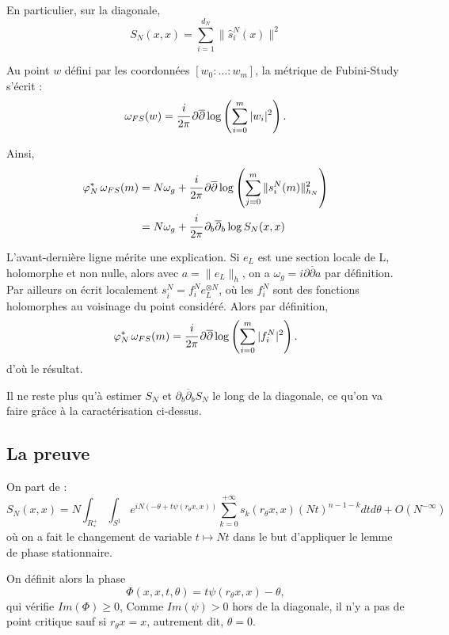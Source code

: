 En particulier, sur la diagonale,
\begin{equation*}
	S_N(x,x)=\sum_{i=1}^{d_N}\|\hat{s}^N_i(x)\|^2
\end{equation*}

Au point $w$ défini par les coordonnées $[w_0:\ldots:w_m]$, la métrique de Fubini-Study s'écrit :
\begin{equation*}
	\omega_{FS}(w) = \cfrac{i}{2\pi}\,\partial\overline{\partial} \log\left(\sum_{i=0}^m|w_i|^2\right).
\end{equation*}

Ainsi,
\begin{align*}
	\varphi_N^*\,\omega_{FS}(m) &= N \omega_g + \cfrac{i}{2\pi}\,\partial\overline{\partial} \log\left(\sum_{j=0}^m\|s^N_i(m)\|_{h_N}^2\right)\\
	&= N\omega_g + \cfrac{i}{2\pi}\,\partial_b\overline{\partial}_b \log S_N(x,x)
\end{align*}

L'avant-dernière ligne mérite une explication. Si $e_L$ est une section locale de L, holomorphe et non nulle, alors avec $a=\|e_L\|_h$, on a $\omega_g = i \partial \overline{\partial}a$ par définition. Par ailleurs on écrit localement $s^N_i=f_i^Ne_L^{\otimes N}$, où les $f^N_i$ sont des fonctions holomorphes au voisinage du point considéré. Alors par définition, 
\begin{equation*}
	\varphi_N^*\,\omega_{FS}(m) = \cfrac{i}{2\pi}\,\partial\overline{\partial} \log\left(\sum_{i=0}^m|f^N_i|^2\right).
\end{equation*}
d'où le résultat.

Il ne reste plus qu'à estimer $S_N$ et $\partial_b \overline{\partial}_bS_N$ le long de la diagonale, ce qu'on va faire grâce à la caractérisation ci-dessus.

\subsection{La preuve}
On part de :
\begin{equation*}
	S_N(x,x)=N\int_{R^+_*}\int_{S^1}e^{iN(-\theta + t\psi(r_{\theta}x,x))}\sum_{k=0}^{+\infty}s_k(r_{\theta}x,x)(Nt)^{n-1-k}dtd\theta + O(N^{-\infty})
\end{equation*}
où on a fait le changement de variable $t \mapsto Nt$ dans le but d'appliquer le lemme de phase stationnaire.

On définit alors la phase
\begin{equation*}
	\Phi(x,x,t,\theta)=t\psi(r_{\theta}x,x)-\theta,
\end{equation*}
qui vérifie $Im(\Phi) \geq 0$, Comme $Im(\psi) > 0$ hors de la diagonale, il n'y a pas de point critique sauf si $r_{\theta}x=x$, autrement dit, $\theta=0$.

